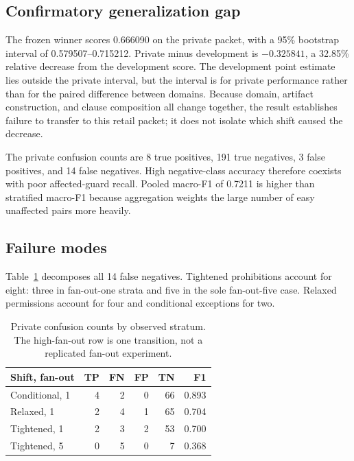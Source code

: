 \documentclass{article}
\begin{document}
\subsection{Confirmatory generalization gap}

The frozen winner scores 0.666090 on the private packet, with a 95\% bootstrap interval of 0.579507--0.715212. Private minus development is $-0.325841$, a 32.85\% relative decrease from the development score. The development point estimate lies outside the private interval, but the interval is for private performance rather than for the paired difference between domains. Because domain, artifact construction, and clause composition all change together, the result establishes failure to transfer to this retail packet; it does not isolate which shift caused the decrease.

The private confusion counts are 8 true positives, 191 true negatives, 3 false positives, and 14 false negatives. High negative-class accuracy therefore coexists with poor affected-guard recall. Pooled macro-F1 of 0.7211 is higher than stratified macro-F1 because aggregation weights the large number of easy unaffected pairs more heavily.

\subsection{Failure modes}

Table~\ref{tab:failure} decomposes all 14 false negatives. Tightened prohibitions account for eight: three in fan-out-one strata and five in the sole fan-out-five case. Relaxed permissions account for four and conditional exceptions for two.

\begin{table}[t]
\caption{Private confusion counts by observed stratum. The high-fan-out row is one transition, not a replicated fan-out experiment.}
\label{tab:failure}
\centering
\small
\begin{tabular}{lrrrrr}
\toprule
Shift, fan-out & TP & FN & FP & TN & F1 \\
\midrule
Conditional, 1 & 4 & 2 & 0 & 66 & 0.893 \\
Relaxed, 1 & 2 & 4 & 1 & 65 & 0.704 \\
Tightened, 1 & 2 & 3 & 2 & 53 & 0.700 \\
Tightened, 5 & 0 & 5 & 0 & 7 & 0.368 \\
\bottomrule
\end{tabular}
\end{table}
\end{document}
